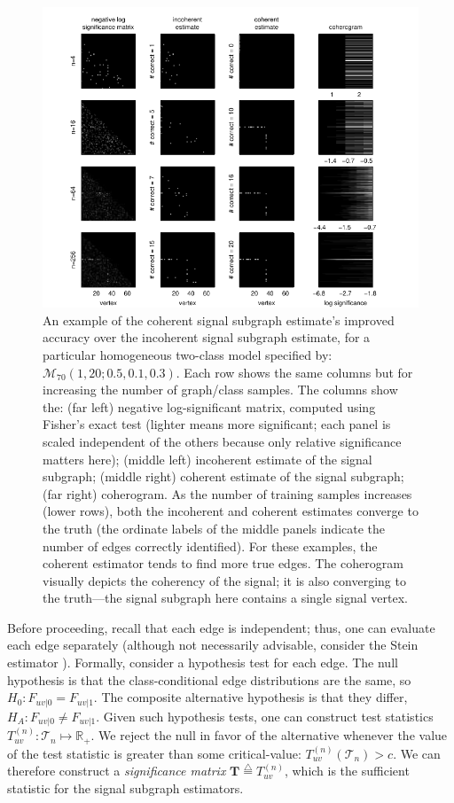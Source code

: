 \documentclass[10pt,journal,cspaper,compsoc]{IEEEtran}
\providecommand{\mc}[1]{\mathcal{#1}}
\providecommand{\mb}[1]{\boldsymbol{#1}}
\newcommand{\Real}{\mathbb{R}}
\newcommand{\defeq}{\overset{\triangle}{=}}
\begin{document}
\begin{figure}[tb!]
	\centering
		\includegraphics[width=1.0\linewidth]{../figs/demo_4x4_homo_V70_s20_p10_q30.pdf}
	\caption{An example of the coherent signal subgraph estimate's improved accuracy over the incoherent signal subgraph estimate, for a particular homogeneous two-class model specified by: $\mc{M}_{70}(1,20;0.5,0.1,0.3)$. Each row shows the same columns but for increasing the number of graph/class samples.  The columns show the: (far left) negative log-significant matrix, computed using Fisher's exact test (lighter means more significant; each panel is scaled independent of the others because only relative significance matters here); (middle left) incoherent estimate of the signal subgraph; (middle right) coherent estimate of the signal subgraph; (far right) coherogram.  As the number of training samples increases (lower rows), both the incoherent and coherent estimates converge to the truth (the ordinate labels of the middle panels indicate the number of edges correctly identified).  For these examples, the coherent estimator tends to find more true edges.  The coherogram visually depicts the coherency of the signal; it is also converging to the truth---the signal subgraph here contains a single signal vertex.}
	\label{fig:4x4}
\end{figure}



Before proceeding, recall that each edge is independent; thus, one can evaluate each edge separately (although not necessarily advisable, consider the Stein estimator \cite{Stein1956}).  Formally, consider a hypothesis test for each edge.  The null hypothesis is that the class-conditional edge distributions are the same, so $H_0: F_{uv|0}=F_{uv|1}$.  The composite alternative hypothesis is that they differ, $H_A: F_{uv|0} \neq F_{uv|1}$.  Given such hypothesis tests, one can construct test statistics $T_{uv}^{(n)}: \mc{T}_n \mapsto \Real_+$.  We reject the null in favor of the alternative whenever the value of the test statistic is greater than some critical-value: $T_{uv}^{(n)}(\mc{T}_n)>c$.  We can therefore construct a \emph{significance matrix} $\mb{T} \defeq T_{uv}^{(n)}$, which is the sufficient statistic for the signal subgraph estimators. %
\end{document}
